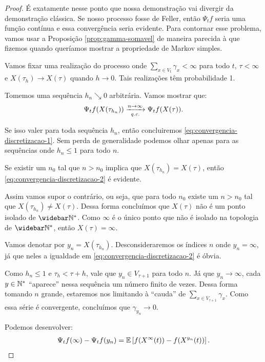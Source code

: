 \begin{proof}
  É exatamente nesse ponto que nossa demonstração vai divergir da
  demonstração clássica. Se nosso processo fosse de Feller, então
  $\Psi_t f$ seria uma função contínua e essa convergência seria
  evidente. Para contornar esse problema, vamos usar a Proposição
  \ref{prop:gamma-somavel} de maneira parecida à que fizemos quando
  queríamos mostrar a propriedade de Markov simples.

  Vamos fixar uma realização do processo onde $\sum_{x \in V_t}
  \gamma_x < \infty$ para todo $t$, $\tau < \infty$ e $X(\tau_{h}) \to
  X(\tau)$ quando $h \to 0$. Tais realizações têm probabilidade 1.


  Tomemos uma sequência $h_n \searrow 0$ arbitrária. Vamos mostrar que:
  \begin{equation}
    \label{eq:convergencia-discretizacao-2}
    \Psi_t f (X(\tau_{h_n})) \xrightarrow[{\emph{q.c.}}]{n \to \infty}
    \Psi_t f(X(\tau)).
  \end{equation}

  Se isso valer para toda sequência $h_n$, então concluiremos
  \eqref{eq:convergencia-discretizacao-1}. Sem perda de generalidade
  podemos olhar apenas para as sequências onde $h_n \leq 1$ para todo
  $n$.

  Se existir um $n_0$ tal que $n > n_0$ implica que $X(\tau_{h_n}) =
  X(\tau)$, então \eqref{eq:convergencia-discretizacao-2} é evidente.

  Assim vamos supor o contrário, ou seja, que para todo $n_0$ existe
  um $n > n_0$ tal que $X(\tau_{h_n}) \neq X(\tau)$. Dessa forma
  concluímos que $X(\tau)$ não é um ponto isolado de $\Nzb$. Como
  $\infty$ é o único ponto que não é isolado na topologia de $\Nzb$,
  então $X(\tau) = \infty$.

  Vamos denotar por $y_n = X(\tau_{h_n})$. Desconsideraremos os
  índices $n$ onde $y_n = \infty$, já que neles a igualdade em
  \eqref{eq:convergencia-discretizacao-2} é óbvia.

  Como $h_n \leq 1$ e $\tau_h < \tau + h$, vale que $y_n \in V_{\tau +
    1}$ para todo $n$. Já que $y_n \to \infty$, cada $y \in {\mathbb{N^*}}$
  ``aparece'' nessa sequência um número finito de vezes.  Dessa forma
  tomando $n$ grande, estaremos nos limitando à ``cauda'' de $\sum_{x
    \in V_{\tau + 1}} \gamma_x$. Como essa série é convergente,
  concluímos que $\gamma_{y_n} \to 0$.

  Podemos desenvolver:
  \begin{align*}
    \Psi_t f(\infty) - \Psi_t f (y_n)
    = {\mathbb{E}} \left[
      f(X^{\infty}(t)) - f(X^{y_n}(t))
    \right].
  \end{align*}


\end{proof}
